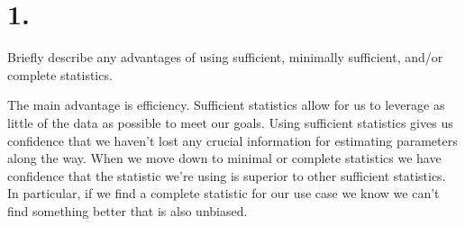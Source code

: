 \section*{1.}

Briefly describe any advantages of using sufficient, minimally sufficient, and/or complete statistics.

The main advantage is efficiency. Sufficient statistics allow for us to leverage as little of the data as possible to meet our goals. Using sufficient statistics gives us confidence that we haven't lost any crucial information for estimating parameters along the way. When we move down to minimal or complete statistics we have confidence that the statistic we're using is superior to other sufficient statistics. In particular, if we find a complete statistic for our use case we know we can't find something better that is also unbiased. 

